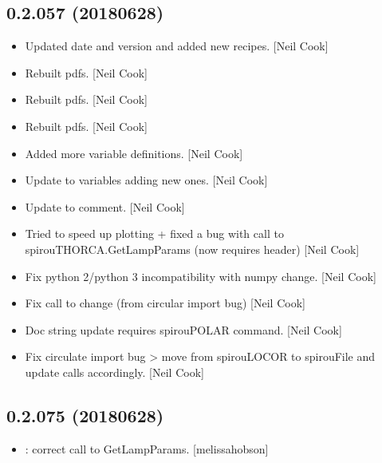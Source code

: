 \documentclass[a4paper,10pt,english]{report}
\begin{document}
\subsection{0.2.057 (2018\sphinxhyphen{}06\sphinxhyphen{}28)}
\label{\detokenize{misc/changelog:id425}}\begin{itemize}
\item {} 
Updated date and version and added new recipes. {[}Neil Cook{]}

\item {} 
Rebuilt pdfs. {[}Neil Cook{]}

\item {} 
Rebuilt pdfs. {[}Neil Cook{]}

\item {} 
Rebuilt pdfs. {[}Neil Cook{]}

\item {} 
Added more variable definitions. {[}Neil Cook{]}

\item {} 
Update to variables \sphinxhyphen{} adding new ones. {[}Neil Cook{]}

\item {} 
Update to comment. {[}Neil Cook{]}

\item {} 
Tried to speed up plotting + fixed a bug with call to
spirouTHORCA.GetLampParams (now requires header) {[}Neil Cook{]}

\item {} 
Fix python 2/python 3 incompatibility with numpy change. {[}Neil Cook{]}

\item {} 
Fix call to  change (from circular import bug) {[}Neil Cook{]}

\item {} 
Doc string update \sphinxhyphen{} requires spirouPOLAR command. {[}Neil Cook{]}

\item {} 
Fix circulate import bug \textendash{}\textgreater{} move  from spirouLOCOR to
spirouFile and update calls accordingly. {[}Neil Cook{]}

\end{itemize}


\subsection{0.2.075 (2018\sphinxhyphen{}06\sphinxhyphen{}28)}
\label{\detokenize{misc/changelog:id426}}\begin{itemize}
\item {} 
: correct call to GetLampParams. {[}melissa\sphinxhyphen{}hobson{]}

\end{itemize}
\end{document}
